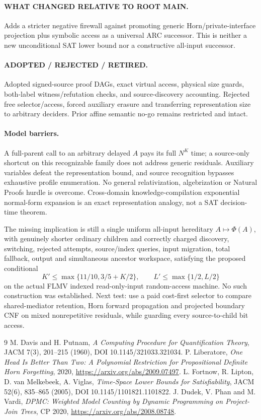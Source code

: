 \documentclass[11pt]{article}
\begin{document}
\paragraph{WHAT CHANGED RELATIVE TO ROOT MAIN.} Adds a stricter negative firewall against promoting generic Horn/private-interface projection plus symbolic access as a universal ARC successor. This is neither a new unconditional SAT lower bound nor a constructive all-input successor.
\paragraph{ADOPTED / REJECTED / RETIRED.} Adopted signed-source proof DAGs, exact virtual access, physical size guards, both-label witness/refutation checks, and source-discovery accounting. Rejected free selector/access, forced auxiliary erasure and transferring representation size to arbitrary deciders. Prior affine semantic no-go remains restricted and intact.
\paragraph{Model barriers.} A full-parent call to an arbitrary delayed $A$ pays its full $N^K$ time; a source-only shortcut on this recognizable family does not address generic residuals. Auxiliary variables defeat the representation bound, and source recognition bypasses exhaustive profile enumeration. No general relativization, algebrization or Natural Proofs hurdle is overcome. Cross-domain knowledge-compilation exponential normal-form expansion is an exact representation analogy, not a SAT decision-time theorem.

The missing implication is still a single uniform all-input hereditary $A\mapsto\Phi(A)$, with genuinely shorter ordinary children and correctly charged discovery, switching, rejected attempts, source/index queries, input migration, total fallback, output and simultaneous ancestor workspace, satisfying the proposed conditional
\[
K'\le\max\{11/10,3/5+K/2\},\qquad L'\le\max\{1/2,L/2\}
\]
on the actual FLMV indexed read-only-input random-access machine. No such construction was established. Next test: use a paid cost-first selector to compare shared-mediator retention, Horn forward propagation and projected boundary CNF on mixed nonrepetitive residuals, while guarding every source-to-child bit access.

\begin{thebibliography}{9}
 M. Davis and H. Putnam, \emph{A Computing Procedure for Quantification Theory}, JACM 7(3), 201--215 (1960), DOI 10.1145/321033.321034.
 P. Liberatore, \emph{One Head Is Better Than Two: A Polynomial Restriction for Propositional Definite Horn Forgetting}, 2020, \url{https://arxiv.org/abs/2009.07497}.
 L. Fortnow, R. Lipton, D. van Melkebeek, A. Viglas, \emph{Time-Space Lower Bounds for Satisfiability}, JACM 52(6), 835--865 (2005), DOI 10.1145/1101821.1101822.
 J. Dudek, V. Phan and M. Vardi, \emph{DPMC: Weighted Model Counting by Dynamic Programming on Project-Join Trees}, CP 2020, \url{https://arxiv.org/abs/2008.08748}.
\end{thebibliography}
\end{document}
